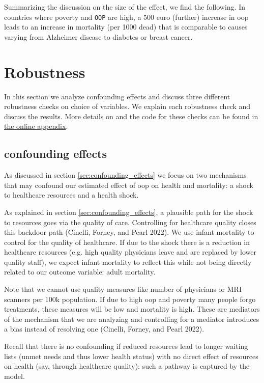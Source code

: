 \documentclass[a4paper,12pt]{article}
\makeatletter
\newcommand{\citeprocitem}[2]{\hyper@linkstart{cite}{citeproc_bib_item_#1}#2\hyper@linkend}
\makeatother
\begin{document}
Summarizing the discussion on the size of the effect, we find the following. In countries where poverty and \texttt{OOP} are high, a 500 euro (further) increase in oop leads to an increase in mortality (per 1000 dead) that is comparable to causes varying from Alzheimer disease to diabetes or breast cancer.



\section{Robustness}
\label{sec:orge8a552d}
In this section we analyze confounding effects and discuss three different robustness checks on choice of variables. We explain each robustness check and discuss the results. More details on and the code for these checks can be found in \href{https://janboone.github.io/out\_of\_pocket\_payments\_and\_health/index.html}{the online appendix}.

\subsection{confounding effects}
\label{sec:orgb3e8a97}

As discussed in section \ref{sec:confounding_effects} we focus on two mechanisms that may confound our estimated effect of oop on health and mortality: a shock to healthcare resources and a health shock.

As explained in section \ref{sec:confounding_effects}, a plausible path for the shock to resources goes via the quality of care. Controlling for healthcare quality closes this backdoor path (\citeprocitem{8}{Cinelli, Forney, and Pearl 2022}). We use infant mortality to control for the quality of healthcare. If due to the shock there is a reduction in healthcare resources (e.g. high quality physicians leave and are replaced by lower quality staff), we expect infant mortality to reflect this while not being directly related to our outcome variable: adult mortality. 

Note that we cannot use quality measures like number of physicians or MRI scanners per 100k population. If due to high oop and poverty many people forgo treatments, these measures will be low and mortality is high. These are mediators of the mechanism that we are analyzing and controlling for a mediator introduces a bias instead of resolving one (\citeprocitem{8}{Cinelli, Forney, and Pearl 2022}).

Recall that there is no confounding if reduced resources lead to longer waiting lists (unmet needs and thus lower health status) with no direct effect of resources on health (say, through healthcare quality): such a pathway is captured by the model.
\end{document}
